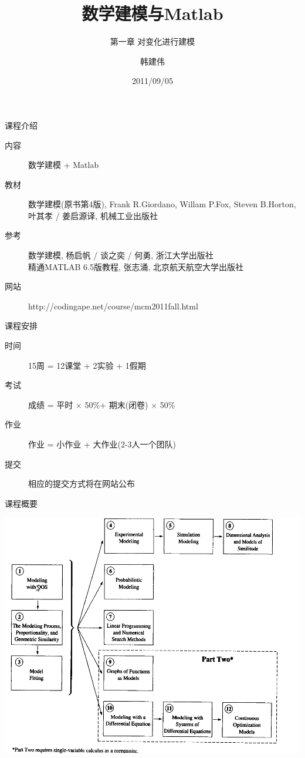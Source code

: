 \documentclass{beamer}
\title{数学建模与Matlab}
\subtitle{第一章 对变化进行建模}
\author{韩建伟}
\institute{
  浙江工商大学信息学院\\
  \texttt{hanjianwei@mail.zjgsu.edu.cn}
}
\date{2011/09/05}
\begin{document}
\begin{frame}[plain]
  \titlepage{}
\end{frame}

\begin{frame}{课程介绍}

\begin{description}
\item[内容] 数学建模 + Matlab
\item[教材] 数学建模(原书第4版), Frank R.Giordano, Willam P.Fox, Steven B.Horton, 叶其孝 / 姜启源译, 机械工业出版社
\item[参考] 数学建模, 杨启帆 / 谈之奕 / 何勇, 浙江大学出版社\\
  精通MATLAB 6.5版教程, 张志涌, 北京航天航空大学出版社
\item[网站] http://codingape.net/course/mcm2011fall.html
\end{description}
  
\end{frame}

\begin{frame}{课程安排}
  \begin{description}
  \item[时间] 15周 = 12课堂 + 2实验 + 1假期
  \item[考试] 成绩 = 平时 $\times$ 50\%+ 期末(闭卷) $\times$ 50\%
  \item[作业] 作业 = 小作业 + 大作业(2-3人一个团队)
  \item[提交] 相应的提交方式将在网站公布
  \end{description}
\end{frame}

\begin{frame}{课程概要}
  \begin{center}
    \includegraphics[width=.8\textwidth{}]{book-overview.png}
  \end{center}
\end{frame}
\end{document}
